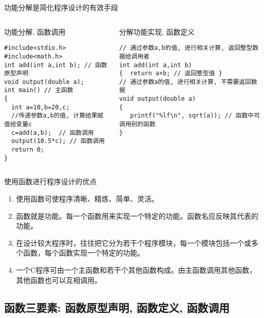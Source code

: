 \begin{frame}{功能分解是简化程序设计的有效手段}
\begin{columns}[T]
\begin{beamerboxesrounded}{功能分解, 函数调用}
\begin{lstlisting}
#include<stdio.h>
#include<math.h>
int add(int a,int b); // 函数原型声明
void output(double a);
int main() // 主函数
{
  int a=10,b=20,c;
  //传递参数a,b的值, 计算结果赋值给变量c 
  c=add(a,b);  // 函数调用
  output(10.5*c); // 函数调用
  return 0; 
}
\end{lstlisting}
\end{beamerboxesrounded}
\begin{beamerboxesrounded}{分解功能实现, 函数定义}
\begin{lstlisting}
// 通过参数a,b的值, 进行相关计算, 返回整型数据给调用者
int add(int a,int b)
{  return a+b; // 返回整型值 }
// 通过参数a的值, 进行相关计算, 不需要返回数据
void output(double a)
{  
   printf("%lf\n", sqrt(a)); // 函数中可调用别的函数
}
\end{lstlisting}
\end{beamerboxesrounded}
\end{columns}
\end{frame}

\begin{frame}{使用函数进行程序设计的优点}
\begin{enumerate}
	\setlength{\itemsep}{.5cm}
	\item 使用函数可使程序清晰、精炼、简单、灵活。
	\item 函数就是功能。每一个函数用来实现一个特定的功能。函数名应反映其代表的功能。
	\item 在设计较大程序时，往往把它分为若干个程序模块，每一个模块包括一个或多个函数，每个函数实现一个特定的功能。
	\item 一个C程序可由一个主函数和若干个其他函数构成。由主函数调用其他函数，其他函数也可以互相调用。	
\end{enumerate}
\end{frame}

\subsection{函数三要素: 函数原型声明, 函数定义, 函数调用}

